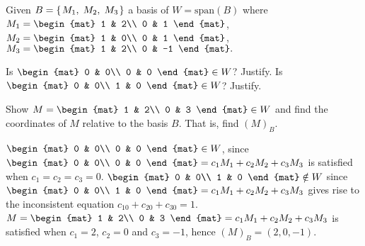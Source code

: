 
\begin{Exercise}[
name={},
title={}, 
difficulty=0,
origin={\cite{YL}}]
Given $
B=\mbox{$\left\{\hspace{0.1em}M_1,\; M_2,\; M_3\hspace{0.1em}\right\}$}
$
a basis of $W=\text{span}(B)$ where
$M_1=
\begin{mat}
1 & 2\\
0 & 1
\end{mat}$,
$M_2=
\begin{mat}
1 & 0\\
0 & 1
\end{mat}$, 
$M_3=
\begin{mat}
1 & 2\\
0 & -1
\end{mat}.
$

\Question Is
$\begin{mat}
0 & 0\\
0 & 0
\end{mat}\in W$? Justify.
\Question Is
$\begin{mat}
0 & 0\\
1 & 0
\end{mat}\in W$? Justify.

\Question Show
$M=\begin{mat}
1 & 2\\
0 & 3
\end{mat}\in W$ and find the coordinates of $M$ relative to the basis $B$. That is, find $(M)_B$.

\end{Exercise}

\begin{Answer}
\Question $\begin{mat}
0 & 0\\
0 & 0
\end{mat}\in W$, since
$\begin{mat}
0 & 0\\
0 & 0
\end{mat}=c_1M_1+c_2M_2+c_3M_3$ is satisfied when $c_1=c_2=c_3=0$.
\Question $\begin{mat}
0 & 0\\
1 & 0
\end{mat}\notin W$ since
$\begin{mat}
0 & 0\\
1 & 0
\end{mat}=c_1M_1+c_2M_2+c_3M_3$ gives rise to the inconsistent equation
$c_10+c_20+c_30=1$. 
\Question $M=\begin{mat}
1 & 2\\
0 & 3
\end{mat}=c_1M_1+c_2M_2+c_3M_3$ is satisfied when $c_1=2$, $c_2=0$ and $c_3=-1$, hence $(M)_B=(2,0,-1)$.
\end{Answer}
